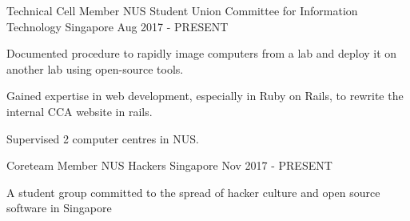 

\begin{cventries}

  \cventry
    {Technical Cell Member} %
    {NUS Student Union Committee for Information Technology} %
    {Singapore} %
    {Aug 2017 - PRESENT} %
    {
      \begin{cvitems} %
      	\item {Documented procedure to rapidly image computers from a lab and deploy it on another lab using open-source tools.}
        \item {Gained expertise in web development, especially in Ruby on Rails, to rewrite the internal CCA website in rails.}
        \item {Supervised 2 computer centres in NUS.}
      \end{cvitems}
    }

 \cventry
    {Coreteam Member} %
    {NUS Hackers} %
    {Singapore} %
    {Nov 2017 - PRESENT} %
    {
      \begin{cvitems} %
      	\item {A student group committed to the spread of hacker culture and open source software in Singapore}
      \end{cvitems}
    }
\end{cventries}
